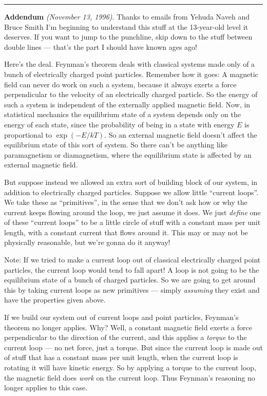 \documentclass{article}
\begin{document}
\begin{center}\rule{0.5\linewidth}{0.5pt}\end{center}

\textbf{Addendum} \emph{(November 13, 1996)}. Thanks to emails from
Yehuda Naveh and Bruce Smith I'm beginning to understand this stuff at
the 13-year-old level it deserves. If you want to jump to the punchline,
skip down to the stuff between double lines --- that's the part I should
have known ages ago!

Here's the deal. Feynman's theorem deals with classical systems made
only of a bunch of electrically charged point particles. Remember how it
goes: A magnetic field can never do work on such a system, because it
always exerts a force perpendicular to the velocity of an electrically
charged particle. So the energy of such a system is independent of the
externally applied magnetic field. Now, in statistical mechanics the
equilibrium state of a system depends only on the energy of each state,
since the probability of being in a state with energy \(E\) is
proportional to \(\exp(-E/kT)\). So an external magnetic field doesn't
affect the equilibrium state of this sort of system. So there can't be
anything like paramagnetism or diamagnetism, where the equilibrium state
is affected by an external magnetic field.

But suppose instead we allowed an extra sort of building block of our
system, in addition to electrically charged particles. Suppose we allow
little ``current loops''. We take these as ``primitives'', in the sense
that we don't ask how or why the current keeps flowing around the loop,
we just assume it does. We just \emph{define} one of these ``current
loops'' to be a little circle of stuff with a constant mass per unit
length, with a constant current that flows around it. This may or may
not be physically reasonable, but we're gonna do it anyway!

Note: If we tried to make a current loop out of classical electrically
charged point particles, the current loop would tend to fall apart! A
loop is not going to be the equilibrium state of a bunch of charged
particles. So we are going to get around this by taking current loops as
new primitives --- simply \emph{assuming} they exist and have the
properties given above.

If we build our system out of current loops and point particles,
Feynman's theorem no longer applies. Why? Well, a constant magnetic
field exerts a force perpendicular to the direction of the current, and
this applies a \emph{torque} to the current loop --- no net force, just
a torque. But since the current loop is made out of stuff that has a
constant mass per unit length, when the current loop is rotating it will
have kinetic energy. So by applying a torque to the current loop, the
magnetic field does \emph{work} on the current loop. Thus Feynman's
reasoning no longer applies to this case.
\end{document}
